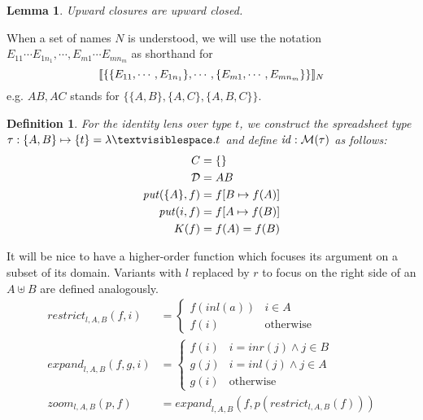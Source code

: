\documentclass{article}
\newtheorem{lemma}{Lemma}
\newtheorem{definition}{Definition}
\begin{document}
\begin{lemma}
    Upward closures are upward closed.
\end{lemma}

When a set of names $N$ is understood, we will use the notation
$E_{11}\cdots E_{1n_1},\cdots,E_{m1}\cdots E_{mn_m}$ as shorthand for
\[\llbracket \{\{E_{11},\cdots,E_{1n_1}\},\cdots,\{E_{m1},\cdots,E_{mn_m}\}\} \rrbracket_{N}\]
e.g. $AB,AC$ stands for $\{\{A,B\},\{A,C\},\{A,B,C\}\}$.

\newcommand{\id}{\mathit{id}}
\begin{definition}
    For the identity lens over type $t$, we construct the spreadsheet type
    $\tau:\{A,B\} \mapsto \{t\}=\lambda\textvisiblespace. t$ and define $\id
    : \mlens\tau$ as follows:
    \begin{align*}
        C &= \{\} \\
        \mathcal D &= AB \\
        \mathit{put}(\{A\},f) &= f[B \mapsto f(A)] \\
        \mathit{put}(i,f) &= f[A \mapsto f(B)] \\
        K(f) &= f(A) = f(B)
    \end{align*}
\end{definition}

\newcommand{\cond}[1]{\left\{\begin{array}{ll}#1\end{array}\right.}
\newcommand{\inl}{\mathit{inl}}
\newcommand{\inr}{\mathit{inr}}
\newcommand{\restrict}{\mathit{restrict}}
\newcommand{\expand}{\mathit{expand}}
\newcommand{\zoom}{\mathit{zoom}}
It will be nice to have a higher-order function which focuses its argument
on a subset of its domain. Variants with $l$ replaced by $r$ to focus on the
right side of an $A \uplus B$ are defined analogously.
\begin{align*}
    \restrict_{l,A,B}(f,i) &= \cond{
        f(\inl(a)) & i \in A \\
        f(i) & \mbox{otherwise}
        } \\
    \expand_{l,A,B}(f,g,i) &= \cond{
        f(i) & i = \inr(j) \land j \in B \\
        g(j) & i = \inl(j) \land j \in A \\
        g(i) & \mbox{otherwise}
        } \\
    \zoom_{l,A,B}(p,f) &= \expand_{l,A,B}(f,p(\restrict_{l,A,B}(f)))
\end{align*}
\end{document}
